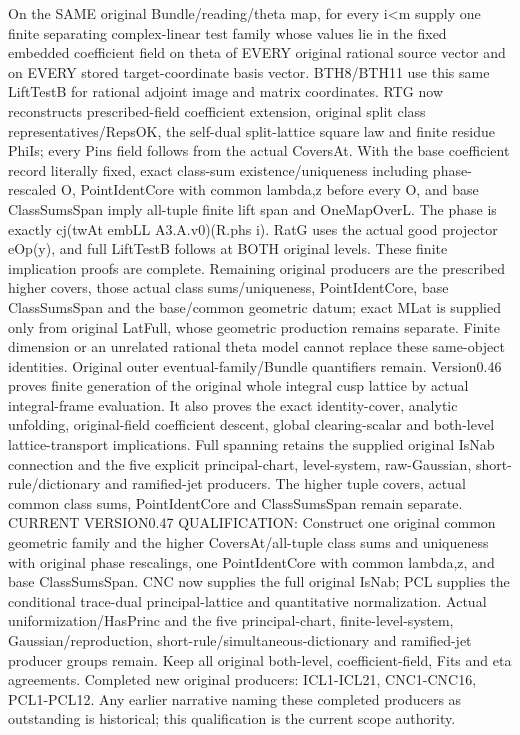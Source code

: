On the SAME original Bundle/reading/theta map, for every i<m supply one finite separating complex-linear test family whose values lie in the fixed embedded coefficient field on theta of EVERY original rational source vector and on EVERY stored target-coordinate basis vector. BTH8/BTH11 use this same LiftTestB for rational adjoint image and matrix coordinates. RTG now reconstructs prescribed-field coefficient extension, original split class representatives/RepsOK, the self-dual split-lattice square law and finite residue PhiIs; every Pins field follows from the actual CoversAt. With the base coefficient record literally fixed, exact class-sum existence/uniqueness including phase-rescaled O, PointIdentCore with common lambda,z before every O, and base ClassSumsSpan imply all-tuple finite lift span and OneMapOverL. The phase is exactly cj(twAt embLL A3.A.v0)(R.phs i). RatG uses the actual good projector eOp(y), and full LiftTestB follows at BOTH original levels. These finite implication proofs are complete. Remaining original producers are the prescribed higher covers, those actual class sums/uniqueness, PointIdentCore, base ClassSumsSpan and the base/common geometric datum; exact MLat is supplied only from original LatFull, whose geometric production remains separate. Finite dimension or an unrelated rational theta model cannot replace these same-object identities. Original outer eventual-family/Bundle quantifiers remain. Version0.46 proves finite generation of the original whole integral cusp lattice by actual integral-frame evaluation. It also proves the exact identity-cover, analytic unfolding, original-field coefficient descent, global clearing-scalar and both-level lattice-transport implications. Full spanning retains the supplied original IsNab connection and the five explicit principal-chart, level-system, raw-Gaussian, short-rule/dictionary and ramified-jet producers. The higher tuple covers, actual common class sums, PointIdentCore and ClassSumsSpan remain separate. CURRENT VERSION0.47 QUALIFICATION: Construct one original common geometric family and the higher CoversAt/all-tuple class sums and uniqueness with original phase rescalings, one PointIdentCore with common lambda,z, and base ClassSumsSpan. CNC now supplies the full original IsNab; PCL supplies the conditional trace-dual principal-lattice and quantitative normalization. Actual uniformization/HasPrinc and the five principal-chart, finite-level-system, Gaussian/reproduction, short-rule/simultaneous-dictionary and ramified-jet producer groups remain. Keep all original both-level, coefficient-field, Fits and eta agreements. Completed new original producers: ICL1-ICL21, CNC1-CNC16, PCL1-PCL12. Any earlier narrative naming these completed producers as outstanding is historical; this qualification is the current scope authority.

